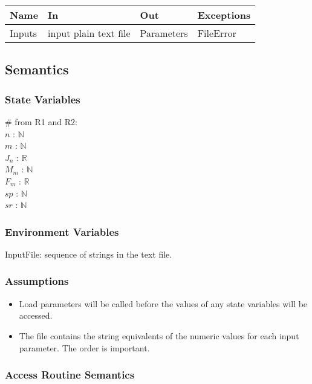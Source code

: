 \documentclass[12pt, titlepage]{article}
\begin{document}
\begin{center}
\begin{tabular}{p{2cm} p{4cm} p{4cm} p{2cm}}
\hline
\textbf{Name} & \textbf{In} & \textbf{Out} & \textbf{Exceptions} \\
\hline
Inputs & input plain text file & Parameters & FileError \\
\hline
\end{tabular}
\end{center}

\subsection{Semantics}
\subsubsection{State Variables}
$\#$ from R1 and R2:\\
$n$ : $\mathbb{N}$ \\
$m$ : $\mathbb{N}$ \\
$J_n$ : $\mathbb{R}$ \\
$M_m$ : $\mathbb{N}$ \\
$F_m$ : $\mathbb{R}$ \\
$sp$ : $\mathbb{N}$ \\
$sr$ : $\mathbb{N}$ \\




\subsubsection{Environment Variables}

InputFile: sequence of strings in the text file.

\subsubsection{Assumptions}
\begin{itemize}
    \item {Load parameters will be called before the values of any state variables will be accessed.}
    \item{The file contains the string equivalents of the numeric values for each input parameter. The order is important.}
\end{itemize}
\subsubsection{Access Routine Semantics}
\end{document}
